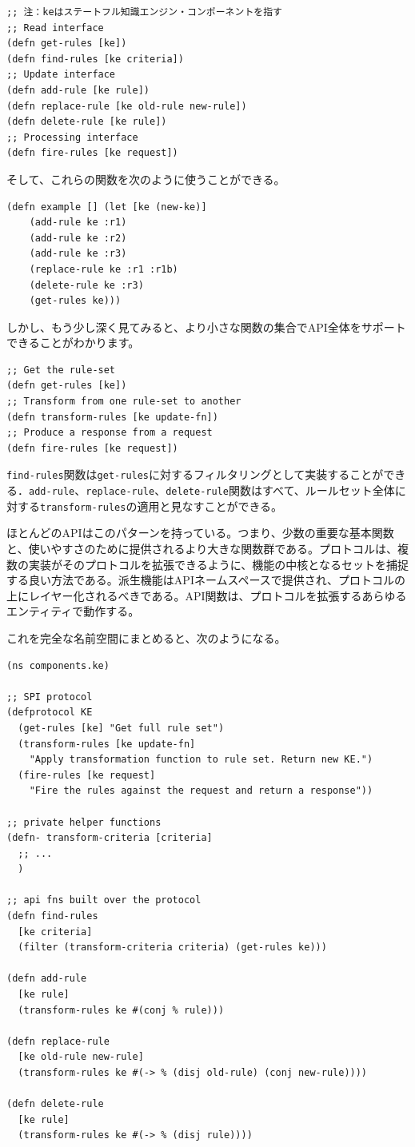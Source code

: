 \begin{lstlisting}[numbers=none]
;; 注：keはステートフル知識エンジン・コンポーネントを指す
;; Read interface
(defn get-rules [ke])
(defn find-rules [ke criteria])
;; Update interface
(defn add-rule [ke rule])
(defn replace-rule [ke old-rule new-rule])
(defn delete-rule [ke rule])
;; Processing interface
(defn fire-rules [ke request])
\end{lstlisting}

そして、これらの関数を次のように使うことができる。

\begin{lstlisting}[numbers=none]
(defn example [] (let [ke (new-ke)]
    (add-rule ke :r1)
    (add-rule ke :r2)
    (add-rule ke :r3)
    (replace-rule ke :r1 :r1b)
    (delete-rule ke :r3)
    (get-rules ke)))
\end{lstlisting}

しかし、もう少し深く見てみると、より小さな関数の集合でAPI全体をサポートできることがわかります。

\begin{lstlisting}[numbers=none]
;; Get the rule-set
(defn get-rules [ke])
;; Transform from one rule-set to another
(defn transform-rules [ke update-fn])
;; Produce a response from a request
(defn fire-rules [ke request])
\end{lstlisting}

\texttt{find-rules}関数は\texttt{get-rules}に対するフィルタリングとして実装することができる．\texttt{add-rule}、\texttt{replace-rule}、\texttt{delete-rule}関数はすべて、ルールセット全体に対する\texttt{transform-rules}の適用と見なすことができる。

ほとんどのAPIはこのパターンを持っている。つまり、少数の重要な基本関数と、使いやすさのために提供されるより大きな関数群である。プロトコルは、複数の実装がそのプロトコルを拡張できるように、機能の中核となるセットを捕捉する良い方法である。派生機能はAPIネームスペースで提供され、プロトコルの上にレイヤー化されるべきである。API関数は、プロトコルを拡張するあらゆるエンティティで動作する。

これを完全な名前空間にまとめると、次のようになる。

\begin{lstlisting}[numbers=none]
(ns components.ke)

;; SPI protocol
(defprotocol KE
  (get-rules [ke] "Get full rule set")
  (transform-rules [ke update-fn]
    "Apply transformation function to rule set. Return new KE.")
  (fire-rules [ke request]
    "Fire the rules against the request and return a response"))

;; private helper functions
(defn- transform-criteria [criteria]
  ;; ...
  )

;; api fns built over the protocol
(defn find-rules
  [ke criteria]
  (filter (transform-criteria criteria) (get-rules ke)))

(defn add-rule
  [ke rule]
  (transform-rules ke #(conj % rule)))

(defn replace-rule
  [ke old-rule new-rule]
  (transform-rules ke #(-> % (disj old-rule) (conj new-rule))))

(defn delete-rule
  [ke rule]
  (transform-rules ke #(-> % (disj rule))))
\end{lstlisting}

